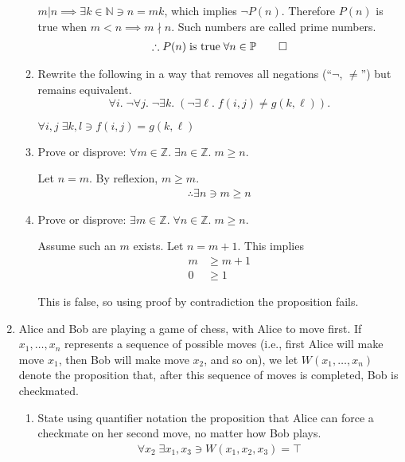 \documentclass[11pt,fleqn]{article}
\newcommand{\N}{\mathbb{N}}
\newcommand{\Z}{\mathbb{Z}}
\begin{document}
\begin{enumerate}
\begin{enumerate}
$m | n \implies \exists k \in \N \ni n=mk$, which implies $\lnot P(n)$.  Therefore $P(n)$ is true when $m<n \implies m \nmid n$.  Such numbers are called prime numbers.
\begin{align}
\therefore P(n)\;\text{is true}\;\forall n \in \mathbb{P}\qed
\end{align}

\item Rewrite the following in a way that
removes all negations (``$\neg$, $\ne$'') but remains equivalent.
\[ \forall i . \; \neg \forall j . \;
\neg \exists k . \; 
(\neg \exists \ell . \; f(i,j) \ne g(k,\ell)). \]

$\forall i,j\;\exists k,l \ni f(i,j) = g(k,\ell)$

\item Prove or disprove:
$\forall m \in \Z . \; \exists n \in \Z . \; m \ge n$.

Let $n = m$.  By reflexion, $m \ge m$.
\begin{align}
\therefore \exists n \ni m \ge n
\end{align}

\item Prove or disprove:
$\exists m \in \Z . \; \forall n \in \Z . \; m \ge n$.

Assume such an $m$ exists.  Let $n = m+1$.  This implies
\begin{align}
  m &\ge m+1\\
  0 &\ge 1
\end{align}

This is false, so using proof by contradiction the proposition fails.

\end{enumerate}

\newpage
\item
Alice and Bob are playing a game of chess,
with Alice to move first.
If $x_1,\dots,x_n$ represents a sequence of possible moves
(i.e., first Alice will make move $x_1$, then Bob will make move $x_2$,
and so on),
we let $W(x_1,\dots,x_n)$ denote the proposition that,
after this sequence of moves is completed,
Bob is checkmated.
\begin{enumerate}
\item State using quantifier notation the proposition that Alice
can force a checkmate on her second move, no matter how Bob plays.
\begin{align}
\forall x_2\;\exists x_1, x_3 \ni W(x_1, x_2, x_3) = \top
\end{align}


\end{enumerate}
\end{enumerate}
\end{document}
